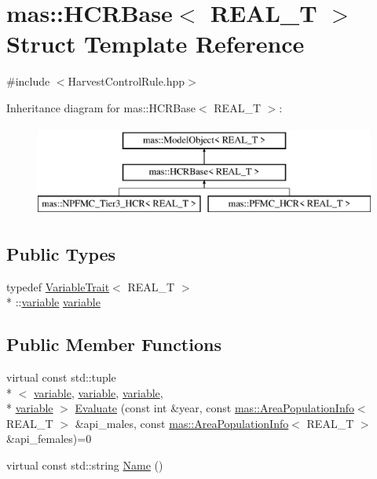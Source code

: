 \hypertarget{structmas_1_1_h_c_r_base}{\section{mas\-:\-:H\-C\-R\-Base$<$ R\-E\-A\-L\-\_\-\-T $>$ Struct Template Reference}
\label{structmas_1_1_h_c_r_base}
}


{\ttfamily \#include $<$Harvest\-Control\-Rule.\-hpp$>$}

Inheritance diagram for mas\-:\-:H\-C\-R\-Base$<$ R\-E\-A\-L\-\_\-\-T $>$\-:\begin{figure}[H]
\begin{center}
\leavevmode
\includegraphics[height=3.000000cm]{structmas_1_1_h_c_r_base}
\end{center}
\end{figure}
\subsection*{Public Types}
\begin{DoxyCompactItemize}
\item 
typedef \hyperlink{structmas_1_1_variable_trait}{Variable\-Trait}$<$ R\-E\-A\-L\-\_\-\-T $>$\\*
\-::\hyperlink{structmas_1_1_model_object_a4e62fdbb5826f8fac311262b888ab10a}{variable} \hyperlink{structmas_1_1_h_c_r_base_a034a831895ed4a6c7224a1f7c4699c08}{variable}
\end{DoxyCompactItemize}
\subsection*{Public Member Functions}
\begin{DoxyCompactItemize}
\item 
virtual const std\-::tuple\\*
$<$ \hyperlink{structmas_1_1_model_object_a4e62fdbb5826f8fac311262b888ab10a}{variable}, \hyperlink{structmas_1_1_model_object_a4e62fdbb5826f8fac311262b888ab10a}{variable}, \hyperlink{structmas_1_1_model_object_a4e62fdbb5826f8fac311262b888ab10a}{variable}, \\*
\hyperlink{structmas_1_1_model_object_a4e62fdbb5826f8fac311262b888ab10a}{variable} $>$ \hyperlink{structmas_1_1_h_c_r_base_a3d923b3276f10e4c7938abde6a134291}{Evaluate} (const int \&year, const \hyperlink{structmas_1_1_area_population_info}{mas\-::\-Area\-Population\-Info}$<$ R\-E\-A\-L\-\_\-\-T $>$ \&api\-\_\-males, const \hyperlink{structmas_1_1_area_population_info}{mas\-::\-Area\-Population\-Info}$<$ R\-E\-A\-L\-\_\-\-T $>$ \&api\-\_\-females)=0
\item 
virtual const std\-::string \hyperlink{structmas_1_1_h_c_r_base_a3f1aa4335bee8d9225776ca5212e1085}{Name} ()
\end{DoxyCompactItemize}

